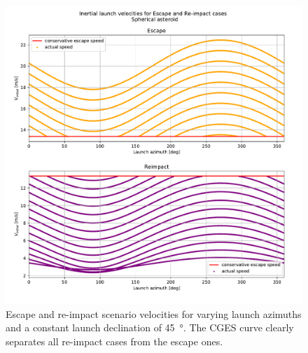 \begin{figure}[htb]
\centering
\captionsetup{justification=centering}
\includegraphics[width=\textwidth, height=0.5\textheight, keepaspectratio=true]{non_conservative_escape_speed/spherical_asteroid_escape_and_capture.pdf}
\caption{Escape and re-impact scenario velocities for varying launch azimuths and a constant launch declination of \protect\SI{45}{\degree}. The \gls{CGES} curve clearly separates all re-impact cases from the escape ones.}
\label{fig:conservative_spherical_asteroid_escape_and_reimpact}
\end{figure}
\FloatBarrier

